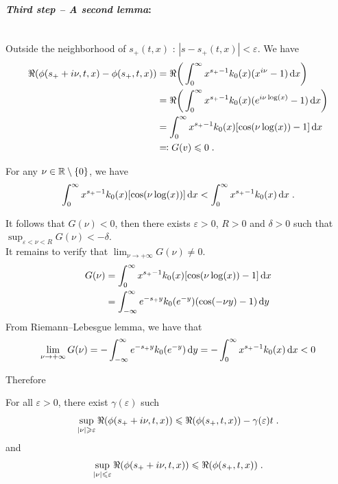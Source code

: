 \medskip
\paragraph{\textit{Third step -- A second lemma}:}\mbox{}\\
Outside the neighborhood of $s_+(t,x)$ : $|s - s_+(t,x)| < \varepsilon$. We have
\begin{align*}
    \Re(\phi(s_+ + i \nu, t, x) - \phi(s_+, t, x)) 
    &=
    \Re \bigg( \int_0^\infty x^{s_+ - 1}k_0(x) (x^{i\nu} - 1) \, \mathrm dx \bigg) \\
    &=
    \Re \bigg( \int_0^\infty x^{s_+ - 1}k_0(x) (e^{i\nu \log(x)}- 1) \, \mathrm dx \bigg) \\ 
    &= 
    \int_0^\infty x^{s_+ - 1}k_0(x) [\cos(\nu \log(x))- 1] \, \mathrm dx  \\
    &\eqqcolon G(v) \leqslant 0
    \; .
\end{align*}

For any $\nu \in \mathbb{R} \setminus \{0\}$, we have
\begin{equation}
 \int_0^\infty x^{s_+ - 1}k_0(x) [\cos(\nu \log(x))] \, \mathrm dx < \int_0^\infty x^{s_+ - 1}k_0(x) \, \mathrm dx
 \; .
\end{equation}

It follows that $G(\nu) < 0$, then there exists $\varepsilon > 0$, $R >0$ and $\delta > 0$
such that $\sup_{\varepsilon < \nu < R}G(\nu) < - \delta$.\\

It remains to verify that $\lim_{\nu \to +\infty}G(\nu) \neq 0$. 
\begin{align*}
    G(\nu) 
    &=  \int_0^\infty x^{s_+ - 1}k_0(x) [\cos(\nu \log(x))- 1] \, \mathrm dx \\
    &=  \int_{-\infty}^\infty e^{-s_+ y}k_0(e^{-y})(\cos(-\nu y) - 1 )\, \mathrm dy
    \end{align*}
From Riemann--Lebesgue lemma, we have that 
\begin{equation}
    \lim_{\nu \to +\infty}G(\nu) = - \int_{-\infty}^\infty e^{-s_+ y}k_0(e^{-y})\, \mathrm dy = - \int_{0}^\infty x^{s_+ - 1}k_0(x)\, \mathrm dx < 0
\end{equation}

Therefore
\begin{lemma} For all $\varepsilon > 0$, there exist $\gamma(\varepsilon)$ such
\begin{equation}
    \sup_{|\nu| \geqslant \varepsilon } \Re(\phi(s_+ + i \nu, t, x)) \leqslant \Re(\phi(s_+, t, x)) - \gamma(\varepsilon)t
    \; .
\end{equation}
and
\begin{equation}
    \sup_{|\nu| \leqslant \varepsilon } \Re(\phi(s_+ + i \nu, t, x)) \leqslant \Re(\phi(s_+, t, x))
    \; .
\end{equation}
\end{lemma}


